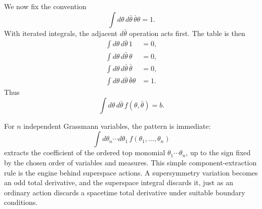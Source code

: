 We now fix the convention
\begin{equation}
\int d\theta\,d\bar\theta\,
\bar\theta\theta=1.
\end{equation}
With iterated integrals, the adjacent \(d\bar\theta\) operation acts first. The table is then
\begin{align}
\int d\theta\,d\bar\theta\,1&=0,\\
\int d\theta\,d\bar\theta\,\theta&=0,\\
\int d\theta\,d\bar\theta\,\bar\theta&=0,\\
\int d\theta\,d\bar\theta\,\bar\theta\theta&=1.
\end{align}
Thus
\begin{equation}
\int d\theta\,d\bar\theta\,
f(\theta,\bar\theta)=b.
\end{equation}

\begin{classroomqa}
\end{classroomqa}

\begin{classroomqa}
\end{classroomqa}

For \(n\) independent Grassmann variables, the pattern is immediate:
\begin{equation}
\int d\theta_n\cdots d\theta_1\,
f(\theta_1,\ldots,\theta_n)
\end{equation}
extracts the coefficient of the ordered top monomial
\(\theta_1\cdots\theta_n\), up to the sign fixed by the chosen order of variables and measures. This simple component-extraction rule is the engine behind superspace actions. A supersymmetry variation becomes an odd total derivative, and the superspace integral discards it, just as an ordinary action discards a spacetime total derivative under suitable boundary conditions.

